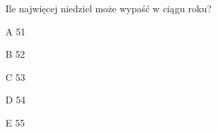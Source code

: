 \begin{tresc}
Ile najwięcej niedziel może wypaść w ciągu roku?
\end{tresc}
\begin{wariant}{A} 51 \end{wariant}
\begin{wariant}{B} 52 \end{wariant}
\begin{wariant}{C} 53 \end{wariant}
\begin{wariant}{D} 54 \end{wariant}
\begin{wariant}{E} 55 \end{wariant}
